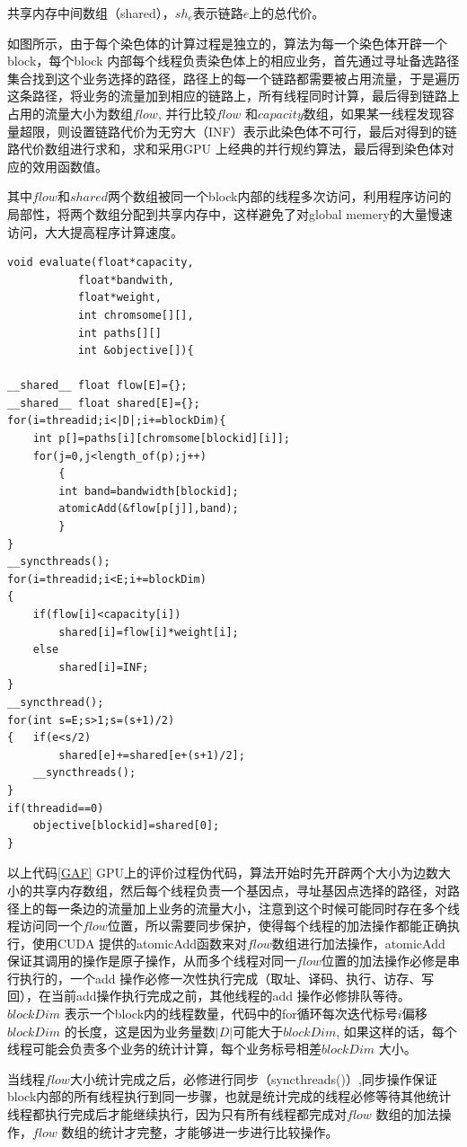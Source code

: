 共享内存中间数组（shared），$sh_e$表示链路$e$上的总代价。

如图所示，由于每个染色体的计算过程是独立的，算法为每一个染色体开辟一个block，每个block 内部每个线程负责染色体上的相应业务，首先通过寻址备选路径集合找到这个业务选择的路径，路径上的每一个链路都需要被占用流量，于是遍历这条路径，将业务的流量加到相应的链路上，所有线程同时计算，最后得到链路上占用的流量大小为数组$flow$, 并行比较$flow$ 和$capacity$数组，如果某一线程发现容量超限，则设置链路代价为无穷大（INF）表示此染色体不可行，最后对得到的链路代价数组进行求和，求和采用GPU 上经典的并行规约算法，最后得到染色体对应的效用函数值。

其中$flow$和$shared$两个数组被同一个block内部的线程多次访问，利用程序访问的局部性，将两个数组分配到共享内存中，这样避免了对global memery的大量慢速访问，大大提高程序计算速度。
\begin{lstlisting}[caption={遗传算法并行评价代码},captionpos=b,firstnumber=1,label={GAF}]
void evaluate(float*capacity,
		   float*bandwith,
		   float*weight,
		   int chromsome[][],
		   int paths[][]
		   int &objective[]){

__shared__ float flow[E]={};
__shared__ float shared[E]={};
for(i=threadid;i<|D|;i+=blockDim){
	int p[]=paths[i][chromsome[blockid][i]];
	for(j=0,j<length_of(p);j++)
		{
		int band=bandwidth[blockid];
		atomicAdd(&flow[p[j]],band);
		}		
}
__syncthreads();
for(i=threadid;i<E;i+=blockDim)
{
	if(flow[i]<capacity[i])
		shared[i]=flow[i]*weight[i];	
	else
		shared[i]=INF;	
}
__syncthread();
for(int s=E;s>1;s=(s+1)/2)
{	if(e<s/2)
		shared[e]+=shared[e+(s+1)/2];
	__syncthreads();
}
if(threadid==0)
	objective[blockid]=shared[0];
}
\end{lstlisting}
以上代码\ref{GAF} GPU上的评价过程伪代码，算法开始时先开辟两个大小为边数大小的共享内存数组，然后每个线程负责一个基因点，寻址基因点选择的路径，对路径上的每一条边的流量加上业务的流量大小，注意到这个时候可能同时存在多个线程访问同一个$flow$位置，所以需要同步保护，使得每个线程的加法操作都能正确执行，使用CUDA 提供的atomicAdd函数来对$flow$数组进行加法操作，atomicAdd 保证其调用的操作是原子操作，从而多个线程对同一$flow$位置的加法操作必修是串行执行的，一个add 操作必修一次性执行完成（取址、译码、执行、访存、写回），在当前add操作执行完成之前，其他线程的add 操作必修排队等待。$blockDim$ 表示一个block内的线程数量，代码中的for循环每次迭代标号$i$偏移$blockDim$ 的长度，这是因为业务量数$|D|$可能大于$blockDim$, 如果这样的话，每个线程可能会负责多个业务的统计计算，每个业务标号相差$blockDim$ 大小。

当线程$flow$大小统计完成之后，必修进行同步（syncthreads()）,同步操作保证block内部的所有线程执行到同一步骤，也就是统计完成的线程必修等待其他统计线程都执行完成后才能继续执行，因为只有所有线程都完成对$flow$ 数组的加法操作，$flow$ 数组的统计才完整，才能够进一步进行比较操作。
  

